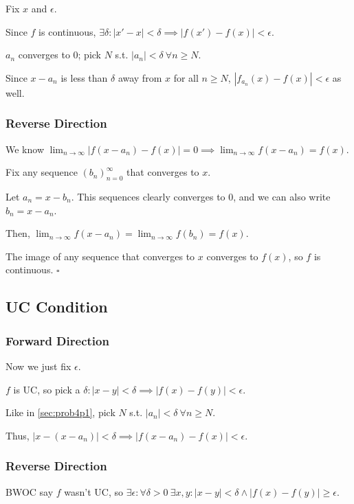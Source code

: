 \documentclass[12pt]{article}
\begin{document}
Fix $x$ and $\epsilon$.

Since $f$ is continuous, $\exists \delta: |x'-x| < \delta \implies |f(x')-f(x)| < \epsilon$.

$a_n$ converges to $0$; pick $N$ s.t. $|a_n| < \delta\ \forall n \ge N$.

Since $x-a_n$ is less than $\delta$ away from $x$ for all $n \ge N$,
$|f_{a_n}(x)-f(x)| < \epsilon$ as well.

\subsubsection{Reverse Direction}

We know $\lim_{n \to \infty} |f(x-a_n)-f(x)|=0 \implies \lim_{n \to \infty} f(x-a_n)=f(x)$.

Fix any sequence $(b_n)_{n=0}^\infty$ that converges to $x$.

Let $a_n = x - b_n$.
This sequences clearly converges to $0$, and we can also write $b_n=x-a_n$.

Then, $\lim_{n \to \infty} f(x-a_n)=\lim_{n \to \infty} f(b_n)=f(x)$.

The image of any sequence that converges to $x$ converges to $f(x)$, so $f$ is continuous. $\square$

\subsection{UC Condition}

\subsubsection{Forward Direction}

Now we just fix $\epsilon$.

$f$ is UC, so pick a $\delta: |x-y| < \delta \implies |f(x)-f(y)| < \epsilon$.

Like in \ref{sec:prob4p1}, pick $N$ s.t. $|a_n| < \delta\ \forall n \ge N$.

Thus, $|x-(x-a_n)| < \delta \implies |f(x-a_n) - f(x)| < \epsilon$.

\subsubsection{Reverse Direction}

BWOC say $f$ wasn't UC, so $\exists \epsilon: \forall \delta > 0\ \exists x, y: |x-y| < \delta \land |f(x)-f(y)| \ge \epsilon$.
\end{document}
